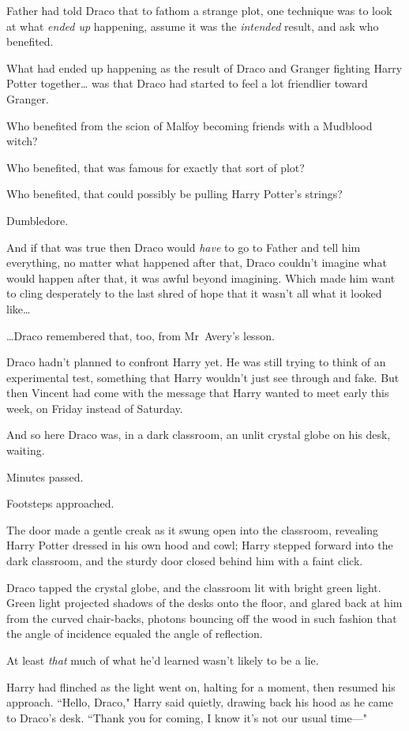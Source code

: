 Father had told Draco that to fathom a strange plot, one technique was to look at what \emph{ended up} happening, assume it was the \emph{intended} result, and ask who benefited.

What had ended up happening as the result of Draco and Granger fighting Harry Potter together{\ldots} was that Draco had started to feel a lot friendlier toward Granger.

Who benefited from the scion of Malfoy becoming friends with a Mudblood witch?

Who benefited, that was famous for exactly that sort of plot?

Who benefited, that could possibly be pulling Harry Potter's strings?

Dumbledore.

And if that was true then Draco would \emph{have} to go to Father and tell him everything, no matter what happened after that, Draco couldn't imagine what would happen after that, it was awful beyond imagining. Which made him want to cling desperately to the last shred of hope that it wasn't all what it looked like{\ldots}

{\ldots}Draco remembered that, too, from Mr~Avery's lesson.

Draco hadn't planned to confront Harry yet. He was still trying to think of an experimental test, something that Harry wouldn't just see through and fake. But then Vincent had come with the message that Harry wanted to meet early this week, on Friday instead of Saturday.

And so here Draco was, in a dark classroom, an unlit crystal globe on his desk, waiting.

Minutes passed.

Footsteps approached.

The door made a gentle creak as it swung open into the classroom, revealing Harry Potter dressed in his own hood and cowl; Harry stepped forward into the dark classroom, and the sturdy door closed behind him with a faint click.

Draco tapped the crystal globe, and the classroom lit with bright green light. Green light projected shadows of the desks onto the floor, and glared back at him from the curved chair-backs, photons bouncing off the wood in such fashion that the angle of incidence equaled the angle of reflection.

At least \emph{that} much of what he'd learned wasn't likely to be a lie.

Harry had flinched as the light went on, halting for a moment, then resumed his approach. ``Hello, Draco," Harry said quietly, drawing back his hood as he came to Draco's desk. ``Thank you for coming, I know it's not our usual time—"

